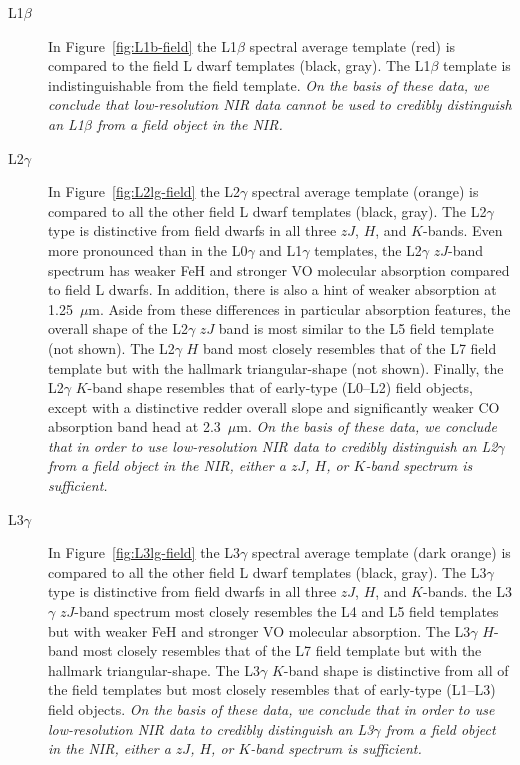 \documentclass[12pt]{aastex6}
\begin{document}
\begin{description}
\item[L1$\beta$]{
In Figure~\ref{fig:L1b-field} the L1$\beta$ spectral average template (red) is compared to the field L dwarf templates (black, gray). The L1$\beta$ template is indistinguishable from the field template.
\emph{On the basis of these data, we conclude that low-resolution NIR data cannot be used to credibly distinguish an L1$\beta$ from a field object in the NIR.}
}

\item[L2$\gamma$]{
In Figure~\ref{fig:L2lg-field} the L2$\gamma$ spectral average template (orange) is compared to all the other field L dwarf templates (black, gray).
The L2$\gamma$ type is distinctive from field dwarfs in all three $zJ$, $H$, and $K$-bands.
Even more pronounced than in the L0$\gamma$ and L1$\gamma$ templates, the L2$\gamma$ $zJ$-band spectrum has weaker FeH and stronger VO molecular absorption compared to field L dwarfs.
In addition, there is also a hint of weaker  absorption at 1.25~$\mu$m. Aside from these differences in particular absorption features, the overall shape of the L2$\gamma$ $zJ$ band is most similar to the L5 field template (not shown).
The L2$\gamma$ $H$ band most closely resembles that of the L7 field template but with the hallmark  triangular-shape (not shown).
Finally, the L2$\gamma$ $K$-band shape resembles that of early-type (L0--L2) field objects, except with a distinctive redder overall slope and significantly weaker CO absorption band head at 2.3~$\mu$m.
\emph{On the basis of these data, we conclude that in order to use low-resolution NIR data to credibly distinguish an L2$\gamma$ from a field object in the NIR, either a $zJ$, $H$, or $K$-band spectrum is sufficient.}
}

\item[L3$\gamma$]{
In Figure~\ref{fig:L3lg-field} the L3$\gamma$ spectral average template (dark orange) is compared to all the other field L dwarf templates (black, gray).
The L3$\gamma$ type is distinctive from field dwarfs in all three $zJ$, $H$, and $K$-bands.
the L3$\gamma$ $zJ$-band spectrum most closely resembles the L4 and L5 field templates but with weaker FeH and stronger VO molecular absorption.
The L3$\gamma$ $H$-band most closely resembles that of the L7 field template but with the hallmark triangular-shape.
The L3$\gamma$ $K$-band shape is distinctive from all of the field templates but most closely resembles that of early-type (L1--L3) field objects.
\emph{On the basis of these data, we conclude that in order to use low-resolution NIR data to credibly distinguish an L3$\gamma$ from a field object in the NIR, either a $zJ$, $H$, or $K$-band spectrum is sufficient.}
}


\end{description}
\end{document}
